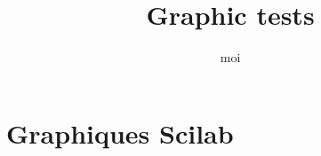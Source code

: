 \documentclass[11pt]{book}
\title{Graphic tests}
\author{moi}
\begin{document}
\maketitle
\thispagestyle{empty}
\tableofcontents
\part{Graphiques Scilab} 

 
\end{document}
